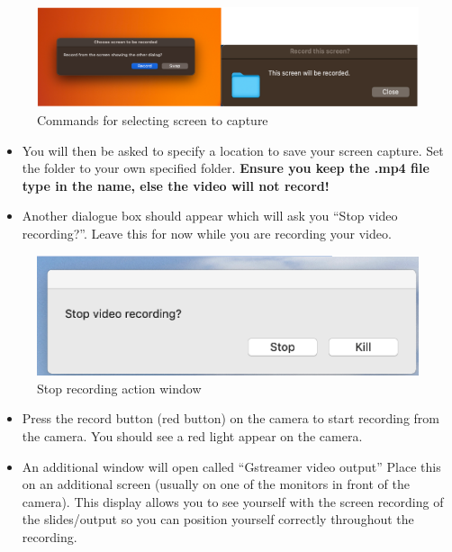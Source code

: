 \documentclass[
]{book}
\begin{document}
\begin{figure}

{\centering \includegraphics[width=1\linewidth]{Screen_capture} 

}

\caption{Commands for selecting screen to capture}\label{fig:screencapture}
\end{figure}

\begin{itemize}
\item
  You will then be asked to specify a location to save your screen capture. Set the folder to your own specified folder. \textbf{Ensure you keep the .mp4 file type in the name, else the video will not record!}
\item
  Another dialogue box should appear which will ask you ``Stop video recording?''. Leave this for now while you are recording your video.
\end{itemize}

\begin{figure}

{\centering \includegraphics[width=1\linewidth]{Record_Stop} 

}

\caption{Stop recording action window}\label{fig:stoprecorde}
\end{figure}

\begin{itemize}
\item
  Press the record button (red button) on the camera to start recording from the camera. You should see a red light appear on the camera.
\item
  An additional window will open called ``Gstreamer video output'' Place this on an additional screen (usually on one of the monitors in front of the camera). This display allows you to see yourself with the screen recording of the slides/output so you can position yourself correctly throughout the recording.
\end{itemize}
\end{document}
